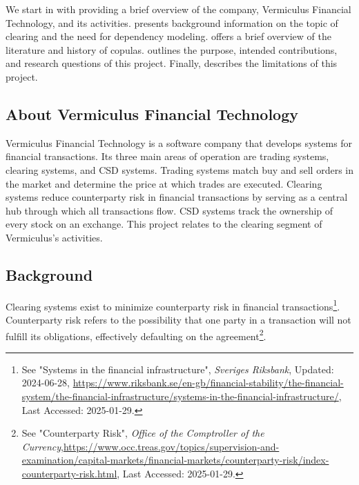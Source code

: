 We start in  with providing a brief overview of the company, Vermiculus Financial Technology, and its activities.  presents background information on the topic of clearing and the need for dependency modeling.  offers a brief overview of the literature and history of copulas.  outlines the purpose, intended contributions, and research questions of this project. Finally,  describes the limitations of this project.

\subsection{About Vermiculus Financial Technology} \label{AboutVFT}
Vermiculus Financial Technology is a software company that develops systems for financial transactions. Its three main areas of operation are trading systems, clearing systems, and \gls{CSD} systems. Trading systems match buy and sell orders in the market and determine the price at which trades are executed. Clearing systems reduce counterparty risk in financial transactions by serving as a central hub through which all transactions flow. \gls{CSD} systems track the ownership of every stock on an exchange. This project relates to the clearing segment of Vermiculus’s activities.

\subsection{Background}\label{Background}
Clearing systems exist to minimize counterparty risk in financial transactions\footnote{See "Systems in the financial infrastructure", \textit{Sveriges Riksbank}, Updated: 2024-06-28, \url{https://www.riksbank.se/en-gb/financial-stability/the-financial-system/the-financial-infrastructure/systems-in-the-financial-infrastructure/}, Last Accessed: 2025-01-29.}. Counterparty risk refers to the possibility that one party in a transaction will not fulfill its obligations, effectively defaulting on the agreement\footnote{See "Counterparty Risk", \textit{Office of the Comptroller of the Currency},\url{https://www.occ.treas.gov/topics/supervision-and-examination/capital-markets/financial-markets/counterparty-risk/index-counterparty-risk.html}, Last Accessed: 2025-01-29.}.


